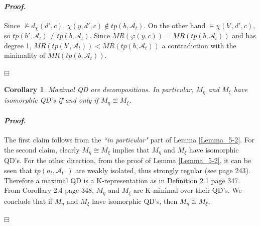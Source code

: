 \documentclass[12pt,a4paper]{amsart}
\newtheorem{cor}[thm]{Corollary}
\theoremstyle{definition}
\theoremstyle{remark}
\renewcommand{\restriction}{\mathbin\upharpoonright}
\newenvironment{cproof}{\paragraph{\emph{Proof.\,}}}{\hfill{$\boxminus$}\par\vspace{2mm}}
\begin{document}
\begin{cproof}
    Since $\not\models d_\chi (d',c)$, $\chi(y,d',c)\notin tp(b,\mathcal{A}_t)$. %
    On the other hand $\models \chi(b',d',c)$, so $tp(b',\mathcal{A}_t)\neq tp(b,\mathcal{A}_t)$. Since $MR(\varphi(y,c))=MR(tp(b,\mathcal{A}_t))$ and has degree 1, $MR(tp(b',\mathcal{A}_t))< MR(tp(b,\mathcal{A}_t))$ a contradiction with the minimality of $MR(tp(b,\mathcal{A}_t))$.

\end{cproof}

\begin{cor}
Maximal QD are decompositions. In particular, $M_\eta$ and $M_\xi$ have isomorphic QD's if and only if $M_\eta\cong M_\xi$. 
\end{cor}
\begin{cproof}
    The first claim follows from the \textit{``in particular"} part of Lemma \ref{Lemma_5-2}. For the second claim, clearly $M_\eta\cong M_\xi$ implies that $M_\eta$ and $M_\xi$ have isomorphic QD's. For the other direction, from the proof of Lemma \ref{Lemma_5-2}, it can be seen that $tp(a_t,\mathcal{A}_{t^-})$ are weakly isolated, thus strongly regular (see \cite{MR918762} page 243). Therefore a maximal QD is a K-representation as in Definition 2.1 \cite{MR918762} page 347. From Corollary 2.4 \cite{MR918762} page 348, $M_\eta$ and $M_\xi$ are K-minimal over their QD's. We conclude that if  $M_\eta$ and $M_\xi$ have isomorphic QD's, then $M_\eta\cong M_\xi$.

\end{cproof}
\end{document}
